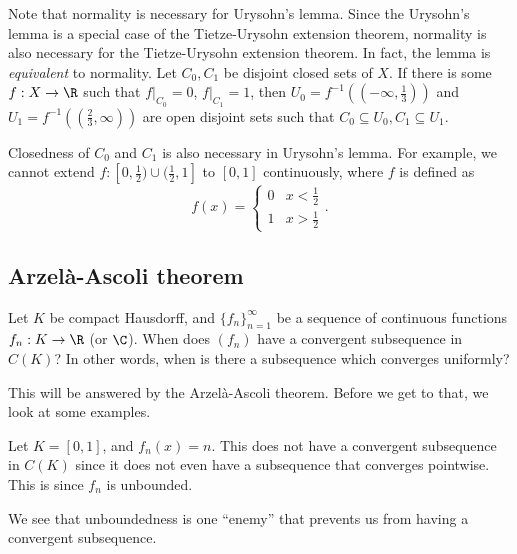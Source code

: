 \documentclass[a4paper]{article}
\begin{document}
Note that normality is necessary for Urysohn's lemma. Since the Urysohn's lemma is a special case of the Tietze-Urysohn extension theorem, normality is also necessary for the Tietze-Urysohn extension theorem. In fact, the lemma is \emph{equivalent} to normality. Let $C_0, C_1$ be disjoint closed sets of $X$. If there is some $f: X \to \R$ such that $f|_{C_0} = 0$, $f|_{C_1} = 1$, then $U_0 = f^{-1}\left(\left(-\infty, \frac{1}{3}\right)\right)$ and $U_1 = f^{-1}\left(\left(\frac{2}{3}, \infty\right)\right)$ are open disjoint sets such that $C_0 \subseteq U_0, C_1 \subseteq U_1$.

Closedness of $C_0$ and $C_1$ is also necessary in Urysohn's lemma. For example, we cannot extend $f: [0, \frac{1}{2}) \cup (\frac{1}{2}, 1]$ to $[0, 1]$ continuously, where $f$ is defined as
\[
  f(x) =
  \begin{cases}
    0 & x < \frac{1}{2}\\
    1 & x > \frac{1}{2}
  \end{cases}.
\]
\subsection{Arzel\`a-Ascoli theorem}
Let $K$ be compact Hausdorff, and $\{f_n\}_{n = 1}^\infty$ be a sequence of continuous functions $f_n: K \to \R$ (or $\C$). When does $(f_n)$ have a convergent subsequence in $C(K)$? In other words, when is there a subsequence which converges uniformly?

This will be answered by the Arzel\`a-Ascoli theorem. Before we get to that, we look at some examples.
\begin{eg}
  Let $K = [0, 1]$, and $f_n(x) = n$. This does not have a convergent subsequence in $C(K)$ since it does not even have a subsequence that converges pointwise. This is since $f_n$ is unbounded.
\end{eg}
We see that unboundedness is one ``enemy'' that prevents us from having a convergent subsequence.
\end{document}
